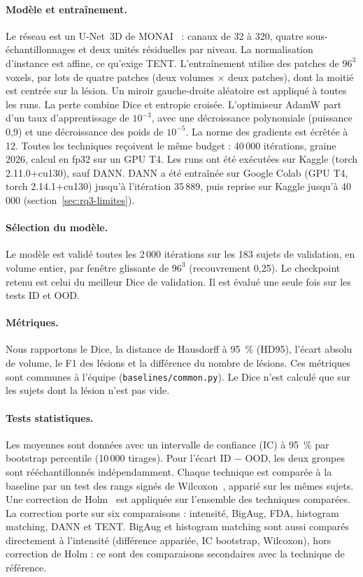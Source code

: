 \paragraph{Modèle et entraînement.}
Le réseau est un U-Net~3D de MONAI~\cite{cardoso2022monai} : canaux de 32 à 320, quatre sous-échantillonnages et deux unités résiduelles par niveau.
La normalisation d'instance est affine, ce qu'exige TENT.
L'entraînement utilise des patches de $96^3$ voxels, par lots de quatre patches (deux volumes $\times$ deux patches), dont la moitié est centrée sur la lésion.
Un miroir gauche-droite aléatoire est appliqué à toutes les runs.
La perte combine Dice et entropie croisée.
L'optimiseur AdamW part d'un taux d'apprentissage de $10^{-3}$, avec une décroissance polynomiale (puissance 0,9) et une décroissance des poids de $10^{-5}$.
La norme des gradients est écrêtée à 12.
Toutes les techniques reçoivent le même budget : 40\,000 itérations, graine 2026, calcul en fp32 sur un GPU T4.
Les runs ont été exécutées sur Kaggle (torch 2.11.0+cu130), sauf DANN.
DANN a été entraînée sur Google Colab (GPU T4, torch 2.14.1+cu130) jusqu'à l'itération 35\,889, puis reprise sur Kaggle jusqu'à 40\,000 (section~\ref{sec:rq3-limites}).

\paragraph{Sélection du modèle.}
Le modèle est validé toutes les 2\,000 itérations sur les 183 sujets de validation, en volume entier, par fenêtre glissante de $96^3$ (recouvrement 0,25).
Le checkpoint retenu est celui du meilleur Dice de validation. Il est évalué une seule fois sur les tests ID et OOD.

\paragraph{Métriques.}
Nous rapportons le Dice, la distance de Hausdorff à 95~\% (HD95), l'écart absolu de volume, le F1 des lésions et la différence du nombre de lésions.
Ces métriques sont communes à l'équipe (\nolinkurl{baselines/common.py}).
Le Dice n'est calculé que sur les sujets dont la lésion n'est pas vide.

\paragraph{Tests statistiques.}
Les moyennes sont données avec un intervalle de confiance (IC) à 95~\% par bootstrap percentile (10\,000 tirages).
Pour l'écart ID $-$ OOD, les deux groupes sont rééchantillonnés indépendamment.
Chaque technique est comparée à la baseline par un test des rangs signés de Wilcoxon~\cite{wilcoxon1945}, apparié sur les mêmes sujets.
Une correction de Holm~\cite{holm1979} est appliquée sur l'ensemble des techniques comparées.
La correction porte sur six comparaisons : intensité, BigAug, FDA, histogram matching, DANN et TENT.
BigAug et histogram matching sont aussi comparés directement à l'intensité (différence appariée, IC bootstrap, Wilcoxon), hors correction de Holm : ce sont des comparaisons secondaires avec la technique de référence.

